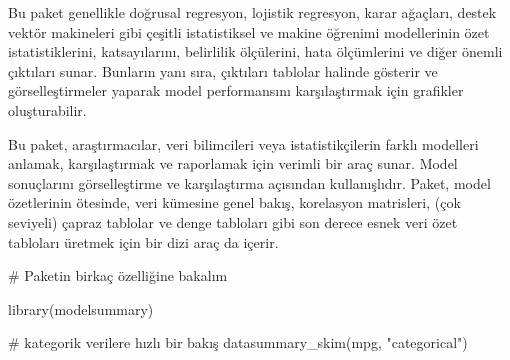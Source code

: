 \documentclass[
  letterpaper,
  DIV=11,
  numbers=noendperiod]{scrreprt}
\newenvironment{Shaded}{\begin{snugshade}}{\end{snugshade}}
\newcommand{\CommentTok}[1]{\textcolor[rgb]{0.37,0.37,0.37}{#1}}
\newcommand{\FunctionTok}[1]{\textcolor[rgb]{0.28,0.35,0.67}{#1}}
\newcommand{\NormalTok}[1]{\textcolor[rgb]{0.00,0.23,0.31}{#1}}
\newcommand{\StringTok}[1]{\textcolor[rgb]{0.13,0.47,0.30}{#1}}
\begin{document}
Bu paket genellikle doğrusal regresyon, lojistik regresyon, karar
ağaçları, destek vektör makineleri gibi çeşitli istatistiksel ve makine
öğrenimi modellerinin özet istatistiklerini, katsayılarını, belirlilik
ölçülerini, hata ölçümlerini ve diğer önemli çıktıları sunar. Bunların
yanı sıra, çıktıları tablolar halinde gösterir ve görselleştirmeler
yaparak model performansını karşılaştırmak için grafikler oluşturabilir.

Bu paket, araştırmacılar, veri bilimcileri veya istatistikçilerin farklı
modelleri anlamak, karşılaştırmak ve raporlamak için verimli bir araç
sunar. Model sonuçlarını görselleştirme ve karşılaştırma açısından
kullanışlıdır. Paket, model özetlerinin ötesinde, veri kümesine genel
bakış, korelasyon matrisleri, (çok seviyeli) çapraz tablolar ve denge
tabloları gibi son derece esnek veri özet tabloları üretmek için bir
dizi araç da içerir.

\begin{Shaded}
\begin{Highlighting}[]
\CommentTok{\# Paketin birkaç özelliğine bakalım}

\FunctionTok{library}\NormalTok{(modelsummary)}

\CommentTok{\# kategorik verilere hızlı bir bakış}
\FunctionTok{datasummary\_skim}\NormalTok{(mpg, }\StringTok{"categorical"}\NormalTok{)}
\end{Highlighting}
\end{Shaded}
\end{document}
